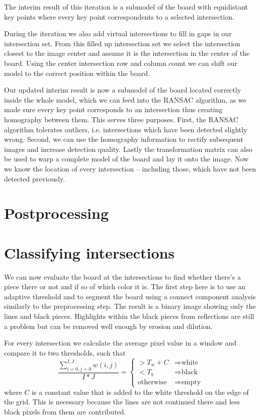 	The interim result of this iteration is a submodel of the board with equidistant key points where every key point correspondents to a selected intersection.

	During the iteration we also add virtual intersections to fill in gaps in our intersection set. From this filled up intersection set we select the intersection closest to the image center and assume it is the intersection in the center of the board. Using the center intersection row and column count we can shift our model to the correct position within the board.

	Our updated interim result is now a submodel of the board located correctly inside the whole model, which we can feed into the RANSAC algorithm, as we made sure every key point corresponds to an intersection thus creating homography between them. This serves three purposes. First, the RANSAC algorithm tolerates outliers, i.e. intersections which have been detected slightly wrong. Second, we can use the homography information to rectify subsequent images and increase detection quality. Lastly the transformation matrix can also be used to warp a complete model of the board and lay it onto the image. Now we know the location of every intersection -- including those, which have not been detected previously.

	\section{Postprocessing}
	\label{detector-postprocessing}

	\section{Classifying intersections}
	\label{detector-classifying}
	We can now evaluate the board at the intersections to find whether there's a piece there or not and if so of which color it is. The first step here is to use an adaptive threshold and to segment the board using a connect component analysis similarly to the preprocessing step. The result is a binary image showing only the lines and black pieces. Highlights within the black pieces from reflections are still a problem but can be removed well enough by erosion and dilution.

	For every intersection we calculate the average pixel value in a window and compare it to two thresholds, such that \begin{equation}
		\frac{\sum^{I,J}_{i=0,j=0}w(i,j)}{I*J} =
		\begin{cases}
		> T_{w} + C & \Rightarrow  \text{white}\\
		< T_{b} & \Rightarrow \text{black}\\
		\text{otherwise} & \Rightarrow \text{empty}
		\end{cases}
	\end{equation}
	where $C$ is a constant value that is added to the white threshold on the edge of the grid. This is necessary because the lines are not continued there and less black pixels from them are contributed.


